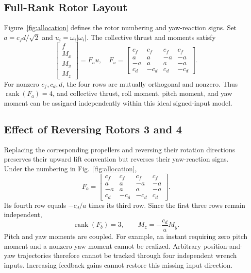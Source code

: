 \documentclass[letterpaper,10pt,conference]{ieeeconf}
\begin{document}
\subsection{Full-Rank Rotor Layout}
Figure~\ref{fig:allocation} defines the rotor numbering and yaw-reaction signs. Set $a=c_fd/\sqrt2$ and $u_i=\omega_i|\omega_i|$. The collective thrust and moments satisfy
\begin{equation}
\begin{bmatrix}f\\M_x\\M_y\\M_z\end{bmatrix}
=F_a u,\quad
F_a=\begin{bmatrix}
c_f&c_f&c_f&c_f\\a&a&-a&-a\\-a&a&a&-a\\c_d&-c_d&c_d&-c_d
\end{bmatrix}.
\label{eq:allocation}
\end{equation}
For nonzero $c_f,c_d,d$, the four rows are mutually orthogonal and nonzero. Thus $\operatorname{rank}(F_a)=4$, and collective thrust, roll moment, pitch moment, and yaw moment can be assigned independently within this ideal signed-input model.

\subsection{Effect of Reversing Rotors 3 and 4}
Replacing the corresponding propellers and reversing their rotation directions preserves their upward lift convention but reverses their yaw-reaction signs. Under the numbering in Fig.~\ref{fig:allocation},
\begin{equation}
F_b=\begin{bmatrix}
c_f&c_f&c_f&c_f\\a&a&-a&-a\\-a&a&a&-a\\c_d&-c_d&-c_d&c_d
\end{bmatrix}.
\end{equation}
Its fourth row equals $-c_d/a$ times its third row. Since the first three rows remain independent,
\begin{equation}
\operatorname{rank}(F_b)=3,\qquad M_z=-\frac{c_d}{a}M_y.
\end{equation}
Pitch and yaw moments are coupled. For example, an instant requiring zero pitch moment and a nonzero yaw moment cannot be realized. Arbitrary position-and-yaw trajectories therefore cannot be tracked through four independent wrench inputs. Increasing feedback gains cannot restore this missing input direction.
\end{document}
